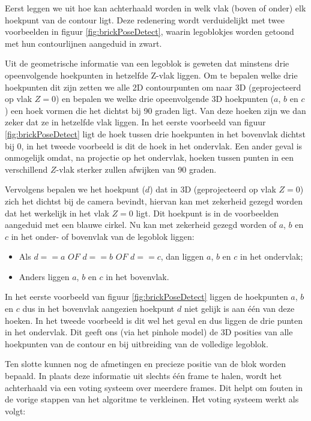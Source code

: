 Eerst leggen we uit hoe kan achterhaald worden in welk vlak (boven of onder) elk hoekpunt van de contour ligt. Deze redenering wordt verduidelijkt met twee voorbeelden in figuur \ref{fig:brickPoseDetect}, waarin legoblokjes worden getoond met hun contourlijnen aangeduid in zwart.

Uit de geometrische informatie van een legoblok is geweten dat minstens drie opeenvolgende hoekpunten in hetzelfde Z-vlak liggen. Om te bepalen welke drie hoekpunten dit zijn zetten we alle 2D contourpunten om naar 3D (geprojecteerd op vlak $Z = 0$) en bepalen we welke drie opeenvolgende 3D hoekpunten ($a$, $b$ en $c$) een hoek vormen die het dichtst bij 90 graden ligt. Van deze hoeken zijn we dan zeker dat ze in hetzelfde vlak liggen. In het eerste voorbeeld van figuur \ref{fig:brickPoseDetect} ligt de hoek tussen drie hoekpunten in het bovenvlak dichtst bij 0, in het tweede voorbeeld is dit de hoek in het ondervlak. Een ander geval is onmogelijk omdat, na projectie op het ondervlak, hoeken tussen punten in een verschillend $Z$-vlak sterker zullen afwijken van 90 graden.

Vervolgens bepalen we het hoekpunt ($d$) dat in 3D (geprojecteerd op vlak $Z = 0$) zich het dichtst bij de camera bevindt, hiervan kan met zekerheid gezegd worden dat het werkelijk in het vlak $Z = 0$ ligt. Dit hoekpunt is in de voorbeelden aangeduid met een blauwe cirkel. Nu kan met zekerheid gezegd worden of $a$, $b$ en $c$ in het onder- of bovenvlak van de legoblok liggen: 
\begin{itemize}
\item Als $d == a$ $OF$ $d == b$ $OF$ $d == c$, dan liggen $a$, $b$ en $c$ in het ondervlak;
\item Anders liggen $a$, $b$ en $c$ in het bovenvlak.
\end{itemize}
In het eerste voorbeeld van figuur \ref{fig:brickPoseDetect} liggen de hoekpunten $a$, $b$ en $c$ dus in het bovenvlak aangezien hoekpunt $d$ niet gelijk is aan \'e\'en van deze hoeken. In het tweede voorbeeld is dit wel het geval en dus liggen de drie punten in het ondervlak. Dit geeft ons (via het pinhole model) de 3D posities van alle hoekpunten van de contour en bij uitbreiding van de volledige legoblok.

Ten slotte kunnen nog de afmetingen en precieze positie van de blok worden bepaald. In plaats deze informatie uit slechts \'e\'en frame te halen, wordt het achterhaald via een voting systeem over meerdere frames. Dit helpt om fouten in de vorige stappen van het algoritme te verkleinen. Het voting systeem werkt als volgt: 

